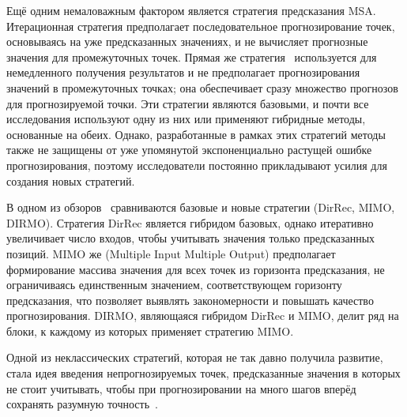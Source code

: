 \documentclass[a4paper, 12pt]{extarticle}
\begin{document}
Ещё одним немаловажным фактором является стратегия предсказания MSA. Итерационная стратегия предполагает последовательное прогнозирование точек, основываясь на уже предсказанных значениях, и не вычисляет прогнозные значения для промежуточных точек. Прямая же стратегия~\cite{Taieb12} используется для немедленного получения результатов и не предполагает прогнозирования значений в промежуточных точках; она обеспечивает сразу множество прогнозов для прогнозируемой точки. Эти стратегии являются базовыми, и почти все исследования используют одну из них или применяют гибридные методы, основанные на обеих. Однако, разработанные в рамках этих стратегий методы также не защищены от уже упомянутой экспоненциально растущей ошибке прогнозирования, поэтому исследователи постоянно прикладывают усилия для создания новых стратегий.

В одном из обзоров~\cite{Taieb12} сравниваются базовые и новые стратегии (DirRec, MIMO, DIRMO). Стратегия DirRec является гибридом базовых, однако итеративно увеличивает число входов, чтобы учитывать значения только предсказанных позиций. MIMO же (Multiple Input Multiple Output) предполагает формирование массива значения для всех точек из горизонта предсказания, не ограничиваясь единственным значением, соответствующем горизонту предсказания, что позволяет выявлять закономерности и повышать качество прогнозирования. DIRMO, являющаяся гибридом DirRec и MIMO, делит ряд на блоки, к каждому из которых применяет стратегию MIMO.

Одной из неклассических стратегий, которая не так давно получила развитие, стала идея введения непрогнозируемых точек, предсказанные значения в которых не стоит учитывать, чтобы при прогнозировании на много шагов вперёд сохранять разумную точность~\cite{Gromov15}.

\newpage


\end{document}
